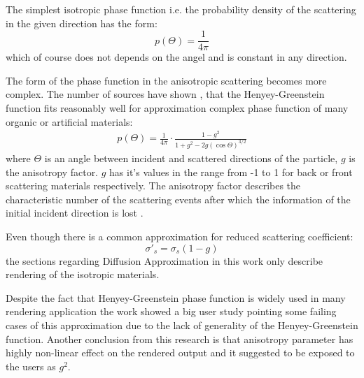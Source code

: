 The simplest isotropic phase function i.e. the probability density of the scattering in the given
direction has the form:
\[
p(\Theta) = \frac{1}{4\pi}
\]
which of course does not depends on the angel and is constant in any direction.

The form of the phase function in the anisotropic scattering becomes more complex. The number of
sources have shown \cite{0031-9155-51-17-N04}, \cite{Gkioulekas:2013:URP:2516971.2516972} that the
Henyey-Greenstein function fits reasonably well for approximation complex phase function of many
organic or artificial materials:
\begin{align}
\label{eq:hg_pdf_theory}
p(\Theta) = \frac{1}{4\pi}\cdot\frac{1-g^2}{1+g^2-2g(\cos{\Theta})^{3/2}}
\end{align}
where $\Theta$ is an angle between incident and scattered directions of the particle, $g$ is the
anisotropy factor. $g$ has it's values in the range from -1 to 1 for back or front scattering
materials respectively. The anisotropy factor describes the characteristic number of the scattering
events after which the information of the initial incident direction is lost
\cite{wang2007biomedical}.

Even though there is a common approximation for reduced scattering coefficient:
\[
\sigma\prime_s = \sigma_s(1 - g)
\]
the sections regarding Diffusion Approximation in this work only describe rendering of the isotropic
materials.

Despite the fact that Henyey-Greenstein phase function is widely used in many rendering application
the work \cite{Gkioulekas:2013:IVR:2508363.2508377} showed a big user study pointing some failing
cases of this approximation due to the lack of generality of the Henyey-Greenstein function. Another
conclusion from this research is that anisotropy parameter has highly non-linear effect on the
rendered output and it suggested to be exposed to the users as $g^2$.
